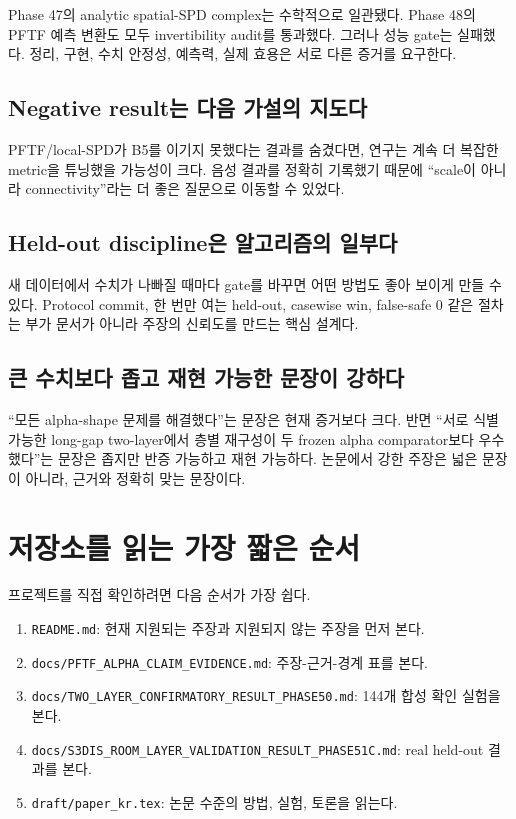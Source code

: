 \documentclass[11pt,a4paper]{article}
\newcommand{\code}[1]{\texttt{#1}}
\begin{document}
Phase 47의 analytic spatial-SPD complex는 수학적으로 일관됐다. Phase 48의
PFTF 예측 변환도 모두 invertibility audit를 통과했다. 그러나 성능 gate는 실패했다.
정리, 구현, 수치 안정성, 예측력, 실제 효용은 서로 다른 증거를 요구한다.

\subsection{Negative result는 다음 가설의 지도다}

PFTF/local-SPD가 B5를 이기지 못했다는 결과를 숨겼다면, 연구는 계속 더 복잡한
metric을 튜닝했을 가능성이 크다. 음성 결과를 정확히 기록했기 때문에 ``scale이
아니라 connectivity''라는 더 좋은 질문으로 이동할 수 있었다.

\subsection{Held-out discipline은 알고리즘의 일부다}

새 데이터에서 수치가 나빠질 때마다 gate를 바꾸면 어떤 방법도 좋아 보이게 만들 수
있다. Protocol commit, 한 번만 여는 held-out, casewise win, false-safe 0 같은
절차는 부가 문서가 아니라 주장의 신뢰도를 만드는 핵심 설계다.

\subsection{큰 수치보다 좁고 재현 가능한 문장이 강하다}

``모든 alpha-shape 문제를 해결했다''는 문장은 현재 증거보다 크다. 반면
``서로 식별 가능한 long-gap two-layer에서 층별 재구성이 두 frozen alpha
comparator보다 우수했다''는 문장은 좁지만 반증 가능하고 재현 가능하다.
논문에서 강한 주장은 넓은 문장이 아니라, 근거와 정확히 맞는 문장이다.

\section{저장소를 읽는 가장 짧은 순서}

프로젝트를 직접 확인하려면 다음 순서가 가장 쉽다.

\begin{enumerate}
  \item \code{README.md}: 현재 지원되는 주장과 지원되지 않는 주장을 먼저 본다.
  \item \code{docs/PFTF\_ALPHA\_CLAIM\_EVIDENCE.md}: 주장-근거-경계 표를 본다.
  \item \code{docs/TWO\_LAYER\_CONFIRMATORY\_RESULT\_PHASE50.md}: 144개 합성
  확인 실험을 본다.
  \item \code{docs/S3DIS\_ROOM\_LAYER\_VALIDATION\_RESULT\_PHASE51C.md}:
  real held-out 결과를 본다.
  \item \code{draft/paper\_kr.tex}: 논문 수준의 방법, 실험, 토론을 읽는다.
\end{enumerate}
\end{document}
